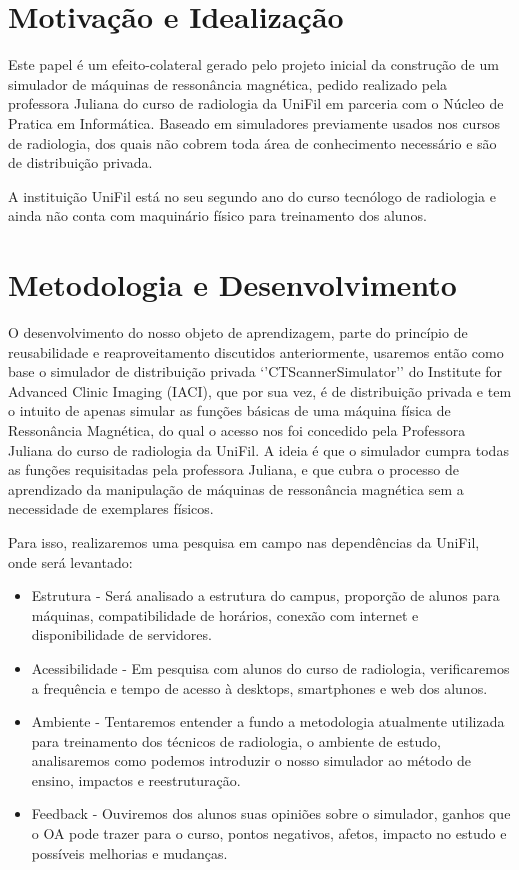 \documentclass[12pt,openright,oneside,a4paper,english,french,spanish,brazil]{unifil}
\begin{document}
\chapter{Motivação e Idealização}%

Este papel é um efeito-colateral gerado pelo projeto inicial da construção de um simulador de máquinas de ressonância magnética, pedido realizado pela professora Juliana do curso de radiologia da UniFil em parceria com o Núcleo de Pratica em Informática. Baseado em simuladores previamente usados nos cursos de radiologia, dos quais não cobrem toda área de conhecimento necessário e são de distribuição privada.

A instituição UniFil está no seu segundo ano do curso tecnólogo de radiologia e ainda não conta com maquinário físico para treinamento dos alunos.

\chapter {Metodologia e Desenvolvimento}
O desenvolvimento do nosso objeto de aprendizagem, parte do princípio de reusabilidade e reaproveitamento discutidos anteriormente, usaremos então como base o simulador de distribuição privada `'CTScannerSimulator'' do Institute for Advanced Clinic Imaging (IACI), que por sua vez, é de distribuição privada e tem o intuito de apenas simular as funções básicas de uma máquina física de Ressonância Magnética, do qual o acesso nos foi concedido pela Professora Juliana do curso de radiologia da UniFil. A ideia é que o simulador cumpra todas as funções requisitadas pela professora Juliana,  e que cubra o processo de aprendizado da manipulação de máquinas de ressonância magnética sem a necessidade de exemplares físicos. 
\par Para isso, realizaremos uma pesquisa em campo nas dependências da UniFil, onde será levantado:
\begin{itemize}
\item Estrutura - Será analisado a estrutura do campus, proporção de alunos para máquinas, compatibilidade de horários, conexão com internet e disponibilidade de servidores.
\item Acessibilidade - Em pesquisa com alunos do curso de radiologia, verificaremos a frequência e tempo de acesso à desktops, smartphones e web dos alunos.
\item Ambiente - Tentaremos entender a fundo a metodologia atualmente utilizada para treinamento dos técnicos de radiologia, o ambiente de estudo, analisaremos como podemos introduzir o nosso simulador ao método de ensino, impactos e reestruturação.
\item Feedback - Ouviremos dos alunos suas opiniões sobre o simulador, ganhos que o OA pode trazer para o curso, pontos negativos, afetos, impacto no estudo e possíveis melhorias e mudanças.
\end{itemize}
\end{document}
